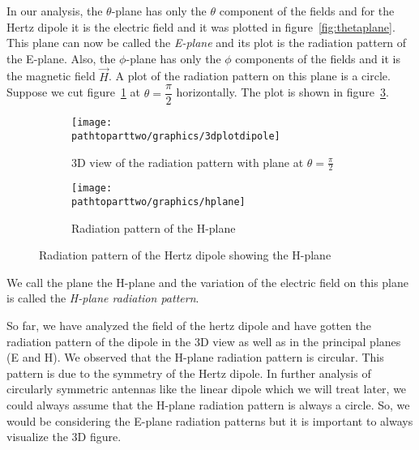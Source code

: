 In our analysis, the $\theta$-plane has only the $\theta$ component of the fields and for the Hertz dipole it is the electric field and it was plotted in figure~\ref{fig:thetaplane}. This plane can now be called the \emph{E-plane} and its plot is the radiation pattern of the E-plane. Also, the $\phi$-plane has only the $\phi$ components of the fields and it is the magnetic field $\vec{H}$. A plot of the radiation pattern on this plane is a circle. Suppose we cut figure~\ref{fig:3dplotdipole} at $\theta=\dfrac{\pi}{2}$ horizontally. The plot is shown in figure~\ref{fig:phiplane}.
\begin{figure}[h]
\centering
\begin{subfigure}[a]{1\linewidth}
\texttt{[image: \\pathtoparttwo/graphics/3dplotdipole]}
\caption{3D view of the radiation pattern with plane at $\theta=\frac{\pi}{2}$}
\label{fig:3dplotdipole}
\end{subfigure}
\begin{subfigure}[b]{1\linewidth}
\texttt{[image: \\pathtoparttwo/graphics/hplane]}
\caption{Radiation pattern of the H-plane}
\label{fig:phiplane}
\end{subfigure}
\caption{Radiation pattern of the Hertz dipole showing the H-plane}
\end{figure}

We call the plane the H-plane and the variation of the electric field on this plane is called the \emph{H-plane radiation pattern}.

So far, we have analyzed the field of the hertz dipole and have gotten the radiation pattern of the dipole in the 3D view as well as in the principal planes (E and H). We observed that the H-plane radiation pattern is circular. This pattern is due to the symmetry of the Hertz dipole. In further analysis of circularly symmetric antennas like the linear dipole which we will treat later, we could always assume that the H-plane radiation pattern is always a circle. So, we would be considering the E-plane radiation patterns but it is important to always visualize the 3D figure.

